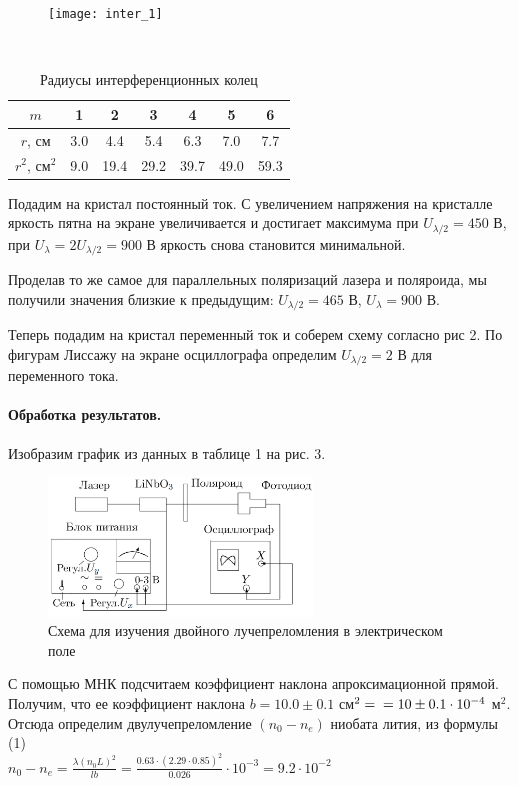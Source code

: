 \documentclass{letask}
\begin{document}
\begin{minipage}{70mm}
 \begin{figure}[H]
 	\texttt{[image: inter\_1]}
 \end{figure}
\end{minipage}
~
\begin{minipage}{95mm}
	\begin{table}[H]
		\centering
		\caption{Радиусы интерференционных колец}
		\label{table1}
		\begin{tabular}{|c|c|c|c|c|c|c|}
			$m$ & 1 & 2 & 3 & 4 & 5 & 6 \\ \midrule
			$r$, см & 3.0 & 4.4 & 5.4 & 6.3 & 7.0 & 7.7 \\ \midrule
			$r^2$, см$^2$ & 9.0 & 19.4 & 29.2 & 39.7 & 49.0 & 59.3 
		\end{tabular}
	\end{table}
Подадим на кристал постоянный ток. С увеличением напряжения на кристалле яркость пятна на экране увеличивается и достигает максимума при $ U_{\lambda/2} = 450 $ В, при $ U_\lambda = 2 U_{\lambda/2} = 900 $ В яркость снова становится минимальной.
\end{minipage}


Проделав то же самое для параллельных поляризаций лазера и поляроида, мы получили значения близкие к предыдущим: $ U_{\lambda/2} = 465 $ В, $ U_\lambda = 900 $ В.

Теперь подадим на кристал переменный ток и соберем схему согласно рис 2. По фигурам Лиссажу на экране осциллографа определим $ U_{\lambda/2} = 2 $ В для переменного тока.
\paragraph{Обработка результатов.} Изобразим график из данных в таблице 1 на рис. 3.

\begin{figure}
	\includegraphics[width=70mm]{scheme2}
	\caption{Схема для изучения двойного лучепреломления в электрическом поле}
\end{figure}
С помощью МНК подсчитаем коэффициент наклона апроксимационной прямой. Получим, что ее коэффициент наклона $ b = 10.0 \pm 0.1 $ см$^2 = \\ = 10 \pm 0.1 \cdot 10^{-4}$ м$ ^2 $. Отсюда определим двулучепреломление $ (n_0-n_e) $ ниобата лития, из формулы (1)\\
$
	n_0-n_e=\frac{\lambda \left(  n_0 L \right)^2}{lb} = \frac{0.63\cdot(2.29\cdot0.85)^2}{0.026}\cdot10^{-3} = 9.2 \cdot 10^{-2}  
$
\end{document}
